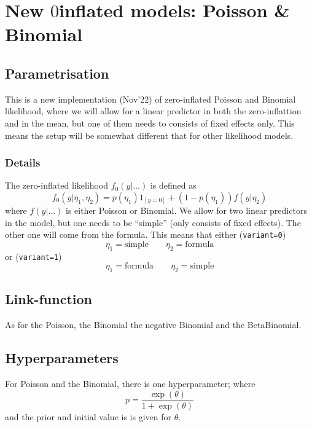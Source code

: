 \documentclass[a4paper,11pt]{article}
\begin{document}
\section*{New $0$inflated models: Poisson \& Binomial}

\subsection*{Parametrisation}

This is a new implementation (Nov'22) of zero-inflated Poisson and
Binomial likelihood, where we will allow for a linear predictor in
both the zero-inflattion and in the mean, but one of them needs to
consists of fixed effects only. This means the setup will be
somewhat different that for other likelihood models. 

\subsubsection*{Details}

The zero-inflated likelihood $f_0(y|\ldots)$ is
defined as
\begin{displaymath}
    f_0(y | \eta_1, \eta_2) = p(\eta_1) 1_{[y=0]} +
    (1-p(\eta_1)) f(y | \eta_2)
\end{displaymath}
where $f(y|\ldots)$ is either Poisson or Binomial. We allow for two
linear predictors in the model, but one needs to be ``simple'' (only
consists of fixed effects). The other one will come from the formula.
This means that either (\texttt{variant=0})
\begin{displaymath}
    \eta_1 = \text{simple} \qquad \eta_2 = \text{formula}
\end{displaymath}
or (\texttt{variant=1})
\begin{displaymath}
    \eta_1 = \text{formula} \qquad \eta_2 = \text{simple}
\end{displaymath}

\subsection*{Link-function}

As for the Poisson, the Binomial the negative Binomial and the BetaBinomial.

\subsection*{Hyperparameters}

For Poisson and the Binomial, there is one hyperparameter; where
\begin{displaymath}
    p = \frac{\exp(\theta)}{1+\exp(\theta)}
\end{displaymath}
and the prior and initial value is is given for $\theta$.
\end{document}
